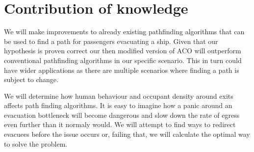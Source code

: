 \chapter{Contribution of knowledge}
\label{ch:contribution}



We will make improvements to already existing pathfinding algorithms that can be used to find a path 
for passengers evacuating a ship. Given that our hypothesis is proven
correct our then modified version of ACO will outperform conventional pathfinding algorithms in our 
specific scenario. This in turn could have wider applications as there are multiple scenarios
where finding a path is subject to change. 

We will determine how human behaviour and occupant density around exits affects path finding algorithms.
It is easy to imagine how a panic around an evacuation bottleneck will become dangerous and slow
down the rate of egress even further than it normaly would. We will attempt to find ways to redirect
evacuees before the issue occurs or, failing that, we will calculate the optimal way to solve the problem.



